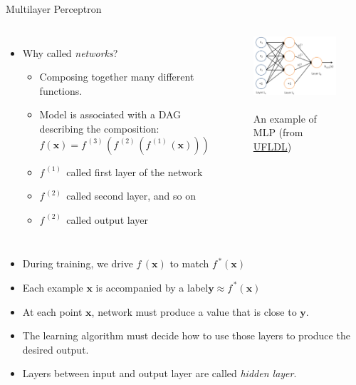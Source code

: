 \documentclass[10pt]{beamer}
\begin{document}
	\begin{frame}{Multilayer Perceptron}
		\begin{columns}[T,onlytextwidth]
			\begin{itemize}
				\item Why called \emph{networks}?
				\onslide<3->
				\begin{itemize}
					\item Composing together many different functions.
					\onslide<4->
					\item Model is associated with a DAG describing the composition:
					\begin{equation*}
					f(\bm{x}) = f^{\,(3)\,}(f^{\,(2)\,}(f^{\,(1)\,}(\bm{x})))
					\end{equation*}
					\item $f^{\,(1)\,}$ called first layer of the network
					\item $f^{\,(2)\,}$ called second layer, and so on
					\item $f^{\,(2)\,}$ called output layer
				\end{itemize}
			\end{itemize}
			\begin{figure}
				\includegraphics<2->[width=10em]{figures/multilayer-perceptron.png}
				\caption{\\ An example of MLP  (from \href{http://ufldl.stanford.edu/wiki/index.php/File:Network331.png}{UFLDL})}
			\end{figure}
		\end{columns}
		\begin{itemize}
			\item During training, we drive $f\,(\bm{x})$ to match $f^{\,*}(\bm{x})$
			\onslide<6->
			\item Each example $\bm{x}$ is accompanied by a label$ \bm{y}\approx f^{\,*}(\bm{x})$
			\onslide<7->
			\item At each point $\bm{x}$, network must produce a value that is close to $\bm{y}$.
			\onslide<8->
			\item The learning algorithm must decide how to use those layers to produce the desired output.
			\onslide<9->
			\item Layers between input and output layer are called \emph{hidden layer}.
		\end{itemize}
	\end{frame}
\end{document}
